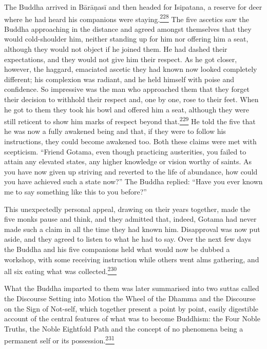 The Buddha arrived in Bārāṇasī and then headed for Isipatana, a reserve
for deer where he had heard his companions were
staying.\label{footprints_split_009.html_fnref228}\hyperref[footprints_split_024.htmlux5cux23fn228]{\textsuperscript{228}}
The five ascetics saw the Buddha approaching in the distance and agreed
amongst themselves that they would cold-shoulder him, neither standing
up for him nor offering him a seat, although they would not object if he
joined them. He had dashed their expectations, and they would not give
him their respect. As he got closer, however, the haggard, emaciated
ascetic they had known now looked completely different; his complexion
was radiant, and he held himself with poise and confidence. So
impressive was the man who approached them that they forget their
decision to withhold their respect and, one by one, rose to their feet.
When he got to them they took his bowl and offered him a seat, although
they were still reticent to show him marks of respect beyond
that.\label{footprints_split_009.html_fnref229}\hyperref[footprints_split_024.htmlux5cux23fn229]{\textsuperscript{229}}
He told the five that he was now a fully awakened being and that, if
they were to follow his instructions, they could become awakened too.
Both these claims were met with scepticism. ``Friend Gotama, even though
practicing austerities, you failed to attain any elevated states, any
higher knowledge or vision worthy of saints. As you have now given up
striving and reverted to the life of abundance, how could you have
achieved such a state now?'' The Buddha replied: ``Have you ever known
me to say something like this to you before?''

This unexpectedly personal appeal, drawing on their years together, made
the five monks pause and think, and they admitted that, indeed, Gotama
had never made such a claim in all the time they had known him.
Disapproval was now put aside, and they agreed to listen to what he had
to say. Over the next few days the Buddha and his five companions held
what would now be dubbed a workshop, with some receiving instruction
while others went alms gathering, and all six eating what was
collected.\label{footprints_split_009.html_fnref230}\hyperref[footprints_split_024.htmlux5cux23fn230]{\textsuperscript{230}}

What the Buddha imparted to them was later summarised into two suttas
called the Discourse Setting into Motion the Wheel of the Dhamma and the
Discourse on the Sign of Not-self, which together present a point by
point, easily digestible account of the central features of what was to
become Buddhism: the Four Noble Truths, the Noble Eightfold Path and the
concept of no phenomena being a permanent self or its
possession.\label{footprints_split_009.html_fnref231}\hyperref[footprints_split_024.htmlux5cux23fn231]{\textsuperscript{231}}

